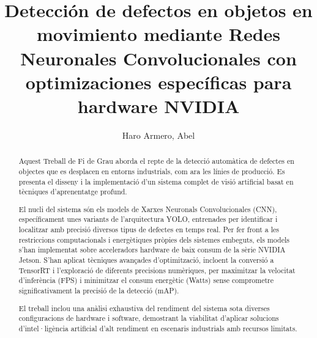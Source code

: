 \documentclass[11pt,spanish,listoffigures,listoftables]{tfgetsinf}
\title{Detección de defectos en objetos en movimiento mediante Redes Neuronales Convolucionales con optimizaciones específicas para hardware NVIDIA}
\author{Haro Armero, Abel}
\begin{document}

\begin{abstract}
Aquest Treball de Fi de Grau aborda el repte de la detecció automàtica de defectes en objectes que es desplacen en entorns industrials, com ara les línies de producció. Es presenta el disseny i la implementació d'un sistema complet de visió artificial basat en tècniques d'aprenentatge profund.

El nucli del sistema són els models de Xarxes Neuronals Convolucionales (CNN), específicament unes variants de l'arquitectura YOLO, entrenades per identificar i localitzar amb precisió diversos tipus de defectes en temps real. Per fer front a les restriccions computacionals i energètiques pròpies dels sistemes embeguts, els models s'han implementat sobre acceleradors hardware de baix consum de la sèrie NVIDIA Jetson. S'han aplicat tècniques avançades d'optimització, incloent la conversió a TensorRT i l'exploració de diferents precisions numèriques, per maximitzar la velocitat d'inferència (FPS) i minimitzar el consum energètic (Watts) sense comprometre significativament la precisió de la detecció (mAP).

El treball inclou una anàlisi exhaustiva del rendiment del sistema sota diverses configuracions de hardware i software, demostrant la viabilitat d'aplicar solucions d'intel·ligència artificial d'alt rendiment en escenaris industrials amb recursos limitats.
\end{abstract}
\end{document}
